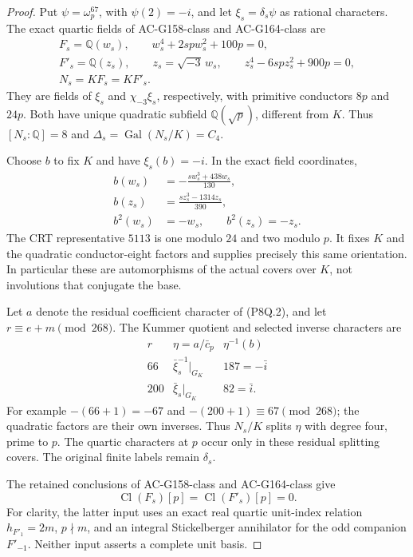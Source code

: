 \begin{proof}
Put $\psi=\omega_p^{67}$, with $\psi(2)=-i$, and let
$\xi_s=\delta_s\psi$ as rational characters.
The exact quartic fields of AC-G158-class and AC-G164-class are
\[
 \begin{gathered}
 F_s=\mathbb Q(w_s),\qquad
        w_s^4+2spw_s^2+100p=0,\\
 F'_s=\mathbb Q(z_s),\qquad
        z_s=\sqrt{-3}\,w_s,\qquad
        z_s^4-6spz_s^2+900p=0,\\
                 N_s=KF_s=KF'_s.
 \end{gathered}
 \tag{P8Q.3}
\]
They are fields of $\xi_s$ and $\chi_{-3}\xi_s$,
respectively, with primitive conductors $8p$ and $24p$.
Both have unique quadratic subfield $\mathbb Q(\sqrt p)$,
different from $K$.
Thus $[N_s:\mathbb Q]=8$ and
$\Delta_s=\operatorname{Gal}(N_s/K)=C_4$.

Choose $b$ to fix $K$ and have $\xi_s(b)=-i$.
In the exact field coordinates,
\[
 \begin{aligned}
 b(w_s)&=-\frac{s w_s^3+438w_s}{130},\\
 b(z_s)&=\frac{s z_s^3-1314z_s}{390},\\
 b^2(w_s)&=-w_s,\qquad b^2(z_s)=-z_s.
 \end{aligned}
 \tag{P8Q.4}
\]
The CRT representative $5113$ is one modulo $24$ and two
modulo $p$.  It fixes $K$ and the quadratic conductor-eight
factors and supplies precisely this same orientation.
In particular these are automorphisms of the actual covers
over $K$, not involutions that conjugate the base.

Let $a$ denote the residual coefficient character of (P8Q.2),
and let $r\equiv e+m\pmod{268}$.
The Kummer quotient and selected inverse characters are
\[
 \begin{array}{c|c|c}
 r&\eta=a/\bar c_p&\eta^{-1}(b)\\ \hline
 66&\bar\xi_s^{-1}|_{G_K}&187=-\bar i\\
 200&\bar\xi_s|_{G_K}&82=\bar i .
 \end{array}
 \tag{P8Q.5}
\]
For example $-(66+1)=-67$ and $-(200+1)\equiv67\pmod{268}$;
the quadratic factors are their own inverses.
Thus $N_s/K$ splits $\eta$ with degree four, prime to $p$.
The quartic characters at $p$ occur only in these residual
splitting covers.  The original finite labels remain $\delta_s$.

The retained conclusions of AC-G158-class and AC-G164-class give
\[
       \operatorname{Cl}(F_s)[p]=
       \operatorname{Cl}(F'_s)[p]=0.
 \tag{P8Q.6}
\]
For clarity, the latter input uses an exact real quartic
unit-index relation $h_{F'_1}=2m$, $p\nmid m$, and an integral
Stickelberger annihilator for the odd companion $F'_{-1}$.
Neither input asserts a complete unit basis.


\end{proof}
